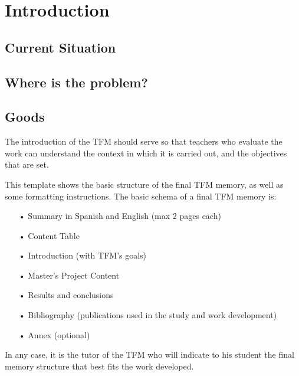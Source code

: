 \chapter{Introduction}



\section{Current Situation}

\section{Where is the problem?}

\section{Goods}





The introduction of the TFM should serve so that teachers who evaluate the work can understand the context in which it is carried out, and the objectives that are set.

This template shows the basic structure of the final TFM memory, as well as some formatting instructions.
The basic schema of a final  TFM memory is:
\begin{itemize}
\item[•] Summary in Spanish and English (max 2 pages each)
\item[•] Content Table
\item[•] Introduction (with TFM's goals)
\item[•] Master’s Project Content
\item[•] Results and conclusions
\item[•] Bibliography (publications used in the study and work development)
\item[•] Annex (optional)
\end{itemize}


In any case, it is the tutor of the TFM who will indicate to his student the final memory structure that best fits the work developed.

